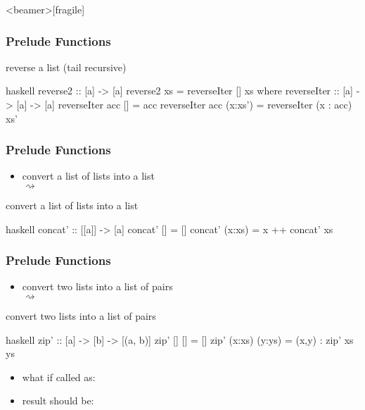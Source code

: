 \documentclass[dvipsnames]{beamer}
\theoremstyle{plain}
\begin{document}
\begin{frame}<beamer>[fragile]
  \frametitle{Prelude Functions}

  \begin{exampleblock}{reverse a list (tail recursive)}
    \begin{pygments}{haskell}
reverse2 :: [a] -> [a]
reverse2 xs = reverseIter [] xs
  where
    reverseIter :: [a] -> [a] -> [a]
    reverseIter acc [] = acc
    reverseIter acc (x:xs') = reverseIter (x : acc) xs'
    \end{pygments}
  \end{exampleblock}
\end{frame}

\begin{frame}[fragile]
  \frametitle{Prelude Functions}

  \begin{itemize}
    \item convert a list of lists into a list\\
      \pygment{haskell}{concat [[2,3],[],[4]} $\rightsquigarrow$
  \end{itemize}

  \begin{exampleblock}{convert a list of lists into a list}
    \begin{pygments}{haskell}
concat' :: [[a]] -> [a]
concat' [] = []
concat' (x:xs) = x ++ concat' xs
    \end{pygments}
  \end{exampleblock}
\end{frame}

\begin{frame}[fragile]
  \frametitle{Prelude Functions}

  \begin{itemize}
    \item convert two lists into a list of pairs\\
       $\rightsquigarrow$
  \end{itemize}

  \begin{exampleblock}{convert two lists into a list of pairs}
    \begin{pygments}{haskell}
zip' :: [a] -> [b] -> [(a, b)]
zip' [] [] = []
zip' (x:xs) (y:ys) = (x,y) : zip' xs ys
    \end{pygments}
  \end{exampleblock}

  \pause
  \begin{itemize}
    \item what if called as:\\
    \item result should be: 
  \end{itemize}
\end{frame}
\end{document}
